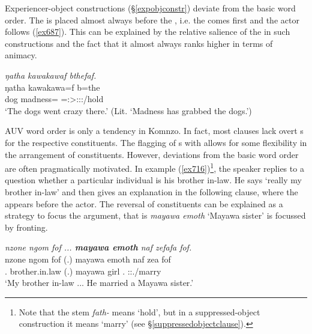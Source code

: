 Experiencer-object constructions (\S{}\ref{expobjconstr}) deviate from the basic word order. The  is placed almost always before the , i.e. the  comes first and the actor follows (\ref{ex687}). This can be explained by the relative salience of the  in such constructions and the fact that it almost always ranks higher in terms of animacy.

\begin{exe}
	\ex \emph{ŋatha kawakawaf bthefaf.}\\
	\gll ŋatha kawakawa=f b=the\\
	dog madness=\Erg{} \Med=\Stsg:\Sbj>\Stpl:\Obj:\Rpst:\Pfv/hold\\
	\trans `The dogs went crazy there.' (Lit. `Madness has grabbed the dogs.')\\
	\label{ex687}
\end{exe}

AUV word order is only a tendency in Komnzo. In fact, most clauses lack overt s for the respective constituents. The flagging of s with  allows for some flexibility in the arrangement of constituents. However, deviations from the basic word order are often pragmatically motivated. In example (\ref{ex716})\footnote{Note that the stem \emph{fath-} means `hold', but in a suppressed-object construction it means `marry' (see \S{}\ref{suppressedobjectclause}).}, the speaker replies to a question whether a particular individual is his brother in-law. He says `really my brother in-law' and then gives an explanation in the following clause, where the  appears before the actor. The reversal of constituents can be explained as a strategy to focus the  argument, that is \emph{mayawa emoth} `Mayawa sister' is focussed by fronting.

\begin{exe}
	\ex \emph{nzone ngom fof ... \textbf{mayawa emoth} naf zefafa fof.}\\
	\gll nzone ngom fof (.) mayawa emoth naf zea fof\\
	\Fsg.\Poss{} brother.in.law \Emph{} (.) mayawa girl \Tsg.\Erg{} \Sg:\Sbj:\Pst.\Pfv/marry \Emph\\
	\trans `My brother in-law ... He married a Mayawa sister.'\\
	\label{ex716}
\end{exe}

